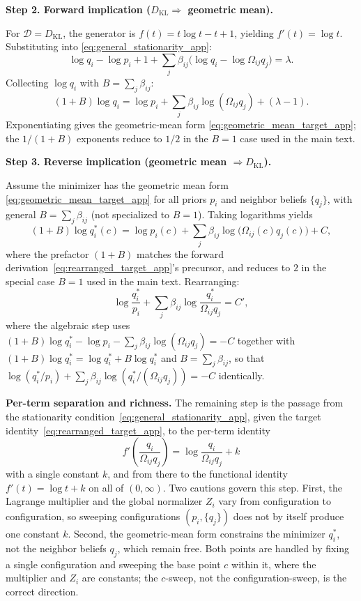 \documentclass[11pt]{article}
\begin{document}
\textbf{Step 2. Forward implication ($D_{\mathrm{KL}}\Rightarrow$ geometric mean).}

For $\mathcal{D}=D_{\mathrm{KL}}$, the generator is $f(t)=t\log t - t + 1$, yielding $f'(t)=\log t$. Substituting into \eqref{eq:general_stationarity_app}:
\[
\log q_i - \log p_i + 1 + \sum_j \beta_{ij}\bigl(\log q_i - \log\Omega_{ij}q_j\bigr) = \lambda.
\]
Collecting $\log q_i$ with $B = \sum_j \beta_{ij}$:
\[
(1+B)\log q_i = \log p_i + \sum_j\beta_{ij}\log(\Omega_{ij}q_j) + (\lambda - 1).
\]
Exponentiating gives the geometric-mean form \eqref{eq:geometric_mean_target_app}; the $1/(1+B)$ exponents reduce to $1/2$ in the $B = 1$ case used in the main text.

\textbf{Step 3. Reverse implication (geometric mean $\Rightarrow D_{\mathrm{KL}}$).}

Assume the minimizer has the geometric mean form \eqref{eq:geometric_mean_target_app} for all priors $p_i$ and neighbor beliefs $\{q_j\}$, with general $B = \sum_j \beta_{ij}$ (not specialized to $B = 1$). Taking logarithms yields
\begin{equation}
(1+B)\log q_i^*(c) = \log p_i(c) + \sum_j\beta_{ij}\log\bigl(\Omega_{ij}(c)q_j(c)\bigr) + C,
\end{equation}
where the prefactor $(1+B)$ matches the forward derivation~\eqref{eq:rearranged_target_app}'s precursor, and reduces to $2$ in the special case $B = 1$ used in the main text. Rearranging:
\begin{equation}
\log\frac{q_i^*}{p_i} + \sum_j\beta_{ij}\log\frac{q_i^*}{\Omega_{ij}q_j} = C',
\label{eq:rearranged_target_app}
\end{equation}
where the algebraic step uses $(1+B)\log q_i^* - \log p_i - \sum_j\beta_{ij}\log(\Omega_{ij}q_j) = -C$ together with $(1+B)\log q_i^* = \log q_i^* + B\log q_i^*$ and $B = \sum_j\beta_{ij}$, so that $\log(q_i^*/p_i) + \sum_j\beta_{ij}\log(q_i^*/(\Omega_{ij}q_j)) = -C$ identically.

\textbf{Per-term separation and richness.} The remaining step is the passage from the stationarity condition~\eqref{eq:general_stationarity_app}, given the target identity~\eqref{eq:rearranged_target_app}, to the per-term identity
\begin{equation}
f'\left(\frac{q_i}{\Omega_{ij}q_j}\right) = \log\frac{q_i}{\Omega_{ij}q_j} + k
\label{eq:ode_app}
\end{equation}
with a single constant $k$, and from there to the functional identity $f'(t) = \log t + k$ on all of $(0, \infty)$. Two cautions govern this step. First, the Lagrange multiplier and the global normalizer $Z_i$ vary from configuration to configuration, so sweeping configurations $(p_i, \{q_j\})$ does not by itself produce one constant $k$. Second, the geometric-mean form constrains the minimizer $q_i^*$, not the neighbor beliefs $q_j$, which remain free. Both points are handled by fixing a single configuration and sweeping the base point $c$ within it, where the multiplier and $Z_i$ are constants; the $c$-sweep, not the configuration-sweep, is the correct direction.
\end{document}
